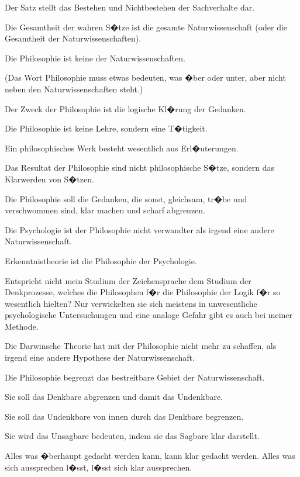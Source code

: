 {Der Satz stellt das Bestehen und Nichtbestehen
der Sachverhalte dar.}


{Die Gesamtheit der wahren S�tze ist die
gesamte Naturwissenschaft (oder die Gesamtheit
der Naturwissenschaften).}


{Die Philosophie ist keine der Naturwissenschaften.

(Das Wort \glqq{}Philosophie\grqq{} muss etwas bedeuten,
was �ber oder unter, aber nicht neben den Naturwissenschaften
steht.)}


{Der Zweck der Philosophie ist die logische
Kl�rung der Gedanken.

Die Philosophie ist keine Lehre, sondern eine
T�tigkeit.

Ein philosophisches Werk besteht wesentlich
aus Erl�uterungen.

Das Resultat der Philosophie sind nicht \glqq{}philosophische
S�tze\grqq{}, sondern das Klarwerden von
S�tzen.

Die Philosophie soll die Gedanken, die sonst,
gleichsam, tr�be und verschwommen sind, klar
machen und scharf abgrenzen.}


{Die Psychologie ist der Philosophie nicht verwandter
als irgend eine andere Naturwissenschaft.

Erkenntnistheorie ist die Philosophie der
Psychologie.

Entspricht nicht mein Studium der Zeichensprache
dem Studium der Denkprozesse, welches
die Philosophen f�r die Philosophie der Logik f�r
so wesentlich hielten? Nur verwickelten sie sich
meistens in unwesentliche psychologische Untersuchungen
und eine analoge Gefahr gibt es auch
bei meiner Methode.}


{Die Darwinsche Theorie hat mit der Philosophie
nicht mehr zu schaffen, als irgend eine andere
Hypothese der Naturwissenschaft.}


{Die Philosophie begrenzt das bestreitbare
Gebiet der Naturwissenschaft.}


{Sie soll das Denkbare abgrenzen und damit das
Undenkbare.

Sie soll das Undenkbare von innen durch das
Denkbare begrenzen.}


{Sie wird das Unsagbare bedeuten, indem sie
das Sagbare klar darstellt.}


{Alles was �berhaupt gedacht werden kann,
kann klar gedacht werden. Alles was sich aussprechen
l�sst, l�sst sich klar aussprechen.}


